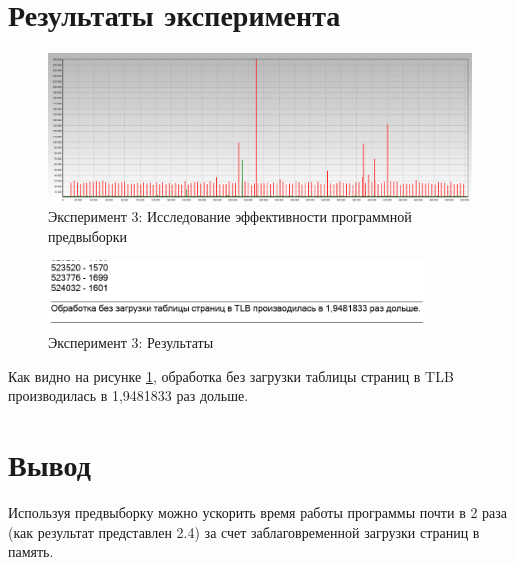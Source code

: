 \section{Результаты эксперимента}
\begin{figure}[ht!]
    \centering
    \includegraphics[width=170mm]{./img/task_03.png}
    \caption{Эксперимент 3: Исследование эффективности программной предвыборки}
\end{figure}

\begin{figure}[ht!]
    \centering
    \includegraphics[width=100mm]{./img/res_03.png}
    \caption{Эксперимент 3: Результаты\label{res_03}}
\end{figure}

Как видно на рисунке \ref{res_03}, обработка без загрузки таблицы страниц в TLB производилась в 1,9481833 раз дольше.

\section{Вывод}
Используя предвыборку можно ускорить время работы программы почти в 2 раза (как результат представлен 2.4) за счет заблаговременной загрузки страниц в память.